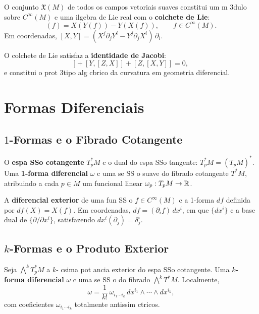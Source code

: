 O conjunto $\mathfrak{X}(M)$ de todos os campos vetoriais suaves constitui um m 3dulo sobre $C^\infty(M)$ e uma ilgebra de Lie real com o \textbf{colchete de Lie}:
\begin{equation}
 [X,Y](f) = X(Y(f)) - Y(X(f)),\qquad f\in C^\infty(M).
\end{equation}
Em coordenadas, $[X,Y] = (X^j\partial_jY^i - Y^j\partial_jX^i)\,\partial_i$.

O colchete de Lie satisfaz a \textbf{identidade de Jacobi}:
\begin{equation}
 [X,[Y,Z]] + [Y,[Z,X]] + [Z,[X,Y]] = 0,
\end{equation}
e constitui o prot 3tipo alg cbrico da curvatura em geometria diferencial.

\section{Formas Diferenciais}
\label{sec:formas}

\subsection{\texorpdfstring{$1$}{1}-Formas e o Fibrado Cotangente}

\begin{defi}
O \textbf{espa SSo cotangente} $T_p^*M$ c o dual do espa SSo tangente: $T_p^*M = (T_pM)^*$. Uma \textbf{1-forma diferencial} $\omega$ c uma se SS o suave do fibrado cotangente $T^*M$, atribuindo a cada $p\in M$ um funcional linear $\omega_p:T_pM\to\mathbb{R}$.
\end{defi}

A \textbf{diferencial exterior} de uma fun SS o $f\in C^\infty(M)$ c a 1-forma $df$ definida por $df(X) = X(f)$. Em coordenadas, $df = (\partial_i f)\,dx^i$, em que $\{dx^i\}$ c a base dual de $\{\partial/\partial x^i\}$, satisfazendo $dx^i(\partial_j) = \delta^i_j$.

\subsection{\texorpdfstring{$k$}{k}-Formas e o Produto Exterior}

Seja $\bigwedge^k T_p^*M$ a $k$- csima pot ancia exterior do espa SSo cotangente. Uma \textbf{$k$-forma diferencial} $\omega$ c uma se SS o do fibrado $\bigwedge^k T^*M$. Localmente,
\begin{equation}
 \omega = \frac{1}{k!}\,\omega_{i_1\cdots i_k}\,dx^{i_1}\wedge\cdots\wedge dx^{i_k},
\end{equation}
com coeficientes $\omega_{i_1\cdots i_k}$ totalmente antissim ctricos.

